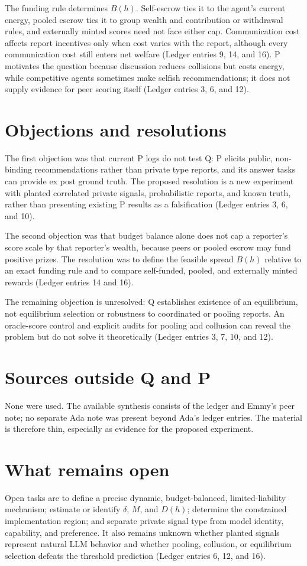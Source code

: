 \documentclass{article}
\begin{document}
The funding rule determines $B(h)$.  Self-escrow ties it to the agent's current energy, pooled escrow ties it to group wealth and contribution or withdrawal rules, and externally minted scores need not face either cap.  Communication cost affects report incentives only when cost varies with the report, although every communication cost still enters net welfare (Ledger entries 9, 14, and 16).  P motivates the question because discussion reduces collisions but costs energy, while competitive agents sometimes make selfish recommendations; it does not supply evidence for peer scoring itself (Ledger entries 3, 6, and 12).

\section*{Objections and resolutions}
The first objection was that current P logs do not test Q: P elicits public, non-binding recommendations rather than private type reports, and its answer tasks can provide ex post ground truth.  The proposed resolution is a new experiment with planted correlated private signals, probabilistic reports, and known truth, rather than presenting existing P results as a falsification (Ledger entries 3, 6, and 10).

The second objection was that budget balance alone does not cap a reporter's score scale by that reporter's wealth, because peers or pooled escrow may fund positive prizes.  The resolution was to define the feasible spread $B(h)$ relative to an exact funding rule and to compare self-funded, pooled, and externally minted rewards (Ledger entries 14 and 16).

The remaining objection is unresolved: Q establishes existence of an equilibrium, not equilibrium selection or robustness to coordinated or pooling reports.  An oracle-score control and explicit audits for pooling and collusion can reveal the problem but do not solve it theoretically (Ledger entries 3, 7, 10, and 12).

\section*{Sources outside Q and P}
None were used.  The available synthesis consists of the ledger and Emmy's peer note; no separate Ada note was present beyond Ada's ledger entries.  The material is therefore thin, especially as evidence for the proposed experiment.

\section*{What remains open}
Open tasks are to define a precise dynamic, budget-balanced, limited-liability mechanism; estimate or identify $\delta$, $M$, and $D(h)$; determine the constrained implementation region; and separate private signal type from model identity, capability, and preference.  It also remains unknown whether planted signals represent natural LLM behavior and whether pooling, collusion, or equilibrium selection defeats the threshold prediction (Ledger entries 6, 12, and 16).
\end{document}
